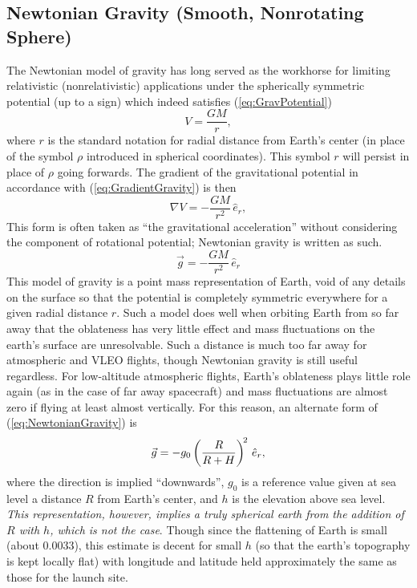 \documentclass[11pt,dvipsnames]{thesis}
\begin{document}
\subsection{Newtonian Gravity (Smooth, Nonrotating Sphere)}
The Newtonian model of gravity has long served as the workhorse for limiting relativistic (nonrelativistic) applications under the spherically symmetric potential (up to a sign) which indeed satisfies (\ref{eq:GravPotential})
\begin{equation}
V = \frac{GM}{r},
\end{equation}
where $r$ is the standard notation for radial distance from Earth's center (in place of the symbol $\rho$ introduced in spherical coordinates). This symbol $r$ will persist in place of $\rho$ going forwards.
The gradient of the gravitational potential in accordance with (\ref{eq:GradientGravity}) is then
\begin{equation}
\nabla V = -\frac{GM}{r^2} \,\hat{e}_r,
\end{equation}
This form is often taken as ``the gravitational acceleration'' without considering the component of rotational potential; Newtonian gravity is written as such.
\begin{equation}
\vec{g} = -\frac{GM}{r^2} \,\hat{e}_r \label{eq:NewtonianGravity}
\end{equation}
This model of gravity is a point mass representation of Earth, void of any details on the surface so that the potential is completely symmetric everywhere for a given radial distance $r$. Such a model does well when orbiting Earth from so far away that the oblateness has very little effect and mass fluctuations on the earth's surface are unresolvable. Such a distance is much too far away for atmospheric and VLEO flights, though 
Newtonian gravity is still useful regardless. For low-altitude atmospheric flights, Earth's oblateness plays little role again (as in the case of far away spacecraft) and mass fluctuations are almost zero if flying at least almost vertically. For this reason, an alternate form of (\ref{eq:NewtonianGravity}) is %
\begin{equation}
\vec{g} = -g_0 \left(\frac{R}{R + H}\right)^{\hspace{-0.15em}2} \,\hat{e}_r, \label{eq:LocalGravity}
\end{equation}
where the direction is implied ``downwards'', $g_0$ is a reference value given at sea level a distance $R$ from Earth's center, and $h$ is the elevation above sea level.
\textit{This representation, however, implies a truly spherical earth from the addition of $R$ with $h$, which is not the case}. 
Though since the flattening of Earth is small (about 0.0033),  this estimate is decent for small $h$ (so that the earth's topography is kept locally flat) with longitude and latitude held approximately the same as those for the launch site.
\end{document}
